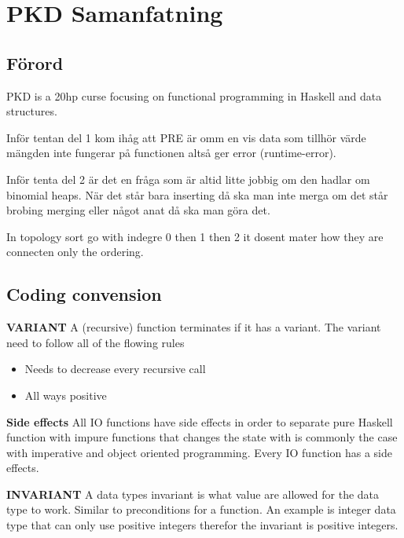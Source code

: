 \chapter{PKD Samanfatning}

\section{Förord}
PKD is a 20hp curse focusing on functional programming in Haskell and data structures.

Inför tentan del 1 kom ihåg att PRE är omm en vis data som tillhör värde mängden inte fungerar på functionen altså ger error (runtime-error). 

Inför tenta del 2 är det en fråga som är altid litte jobbig om den hadlar om
binomial heaps. När det står bara inserting då ska man inte merga om det står brobing merging
eller något anat då ska man göra det.

In topology sort go with indegre 0 then 1 then 2 it dosent mater how they are connecten only the ordering.

\newpage

\section{Coding convension}
\noindent\textbf{VARIANT} \newline
A (recursive) function terminates if it has a variant.
The variant need to follow all of the flowing rules

\begin{itemize}
\item Needs to decrease every recursive call
\item All ways positive
\end{itemize} 

\noindent\textbf{Side effects} \newline
All IO functions have side effects in order to separate pure Haskell function with impure functions
that changes the state with is commonly the case with imperative and object oriented programming.
Every IO function has a side effects.

\noindent\textbf{INVARIANT} \newline
A data types invariant is what value are allowed for the data type to work. Similar to preconditions for
a function. An example is integer data type that can only use positive integers therefor the
invariant is positive integers.



